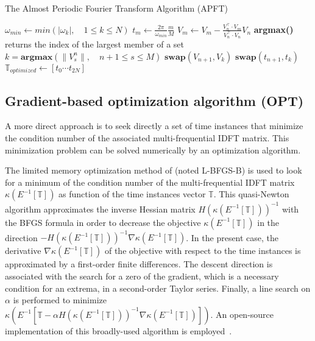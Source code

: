 \begin{algorithm}
\caption{The Almost Periodic Fourier Transform Algorithm (APFT)}
\label{alg:algo_APFT}
\begin{algorithmic}
\STATE $\omega_{min} \leftarrow min \left( |\omega_k |,\quad 1 \leqslant k \leqslant N \right)$
    \STATE $t_m \leftarrow \displaystyle\frac{2\pi}{\omega_{min}}\frac{m}{M}$
\ENDFOR
{}
  \STATE $ V_{m} \leftarrow V_{m} - \displaystyle\frac{V_{n}^\top \cdot V_{m}}{V_{n}^\top \cdot V_{n}} V_{n}$
   \ENDFOR
   \STATE \textbf{argmax()} returns the index of the largest member of a set
   \STATE $k=\textbf{argmax} \left( \| V_s^n \|,\quad n+1\leqslant s \leqslant M\right) $
   \STATE $\textbf{swap}(V_{n+1},V_{k})$
   \STATE $\textbf{swap}(t_{n+1},t_{k})$
\ENDFOR
\STATE $\mathbb{T}_{optimized} \leftarrow [t_0 \cdots t_{2N}]$
\end{algorithmic}
\end{algorithm}

\subsection{Gradient-based optimization algorithm (OPT)}
\label{sec:algo_opt}
A more direct approach is to seek directly a set of time instances
that minimize the condition number of the associated multi-frequential IDFT matrix. 
This minimization problem can be solved numerically by an optimization algorithm.

The limited memory optimization method of
\citet{Byrd1995} (noted L-BFGS-B) is
used to look for a minimum of the condition number of the
multi-frequential IDFT matrix $\kappa \left(E^{-1} \left[\mathbb{T} \right]
\right)$ as function of the time instances vector $\mathbb{T}$. This
quasi-Newton algorithm approximates the inverse Hessian matrix
$H(\kappa \left(E^{-1} \left[\mathbb{T} \right] \right))^{-1}$ with the
BFGS formula in order to decrease the objective $\kappa \left(E^{-1}
  \left[\mathbb{T} \right] \right)$ in the direction $-H(\kappa
\left(E^{-1} \left[\mathbb{T} \right] \right))^{-1}\nabla \kappa \left(E^{-1}
  \left[\mathbb{T} \right] \right)$. In the present case, the
derivative $\nabla \kappa \left(E^{-1} \left[\mathbb{T} \right] \right)$ of
the objective with respect to the time instances is approximated by
a first-order finite differences. The descent direction is
associated with the search for a zero of the gradient, which is a
necessary condition for an extrema, in a second-order Taylor series.
Finally, a line search on $\alpha$ is performed to minimize $\kappa
\left(E^{-1} \left[\mathbb{T} - \alpha H(\kappa \left(E^{-1} \left[\mathbb{T}
      \right] \right))^{-1} \nabla \kappa \left(E^{-1} \left[\mathbb{T}
      \right] \right) \right] \right)$.  An open-source implementation of this
broadly-used algorithm is
employed~\cite{Nocedal1980}.

